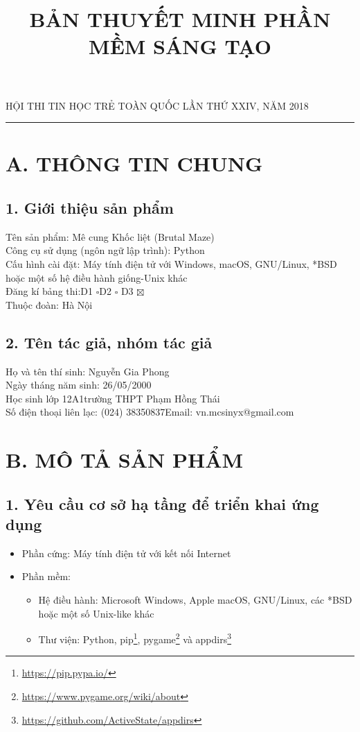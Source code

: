 \documentclass[a4paper,12pt]{article}
\title{BẢN THUYẾT MINH PHẦN MỀM SÁNG TẠO}
\author{}
\date{}
\begin{document}
\begin{center}
HỘI THI TIN HỌC TRẺ TOÀN QUỐC LẦN THỨ XXIV, NĂM 2018
\rule{0.7\textwidth}{0.4pt}
\end{center}
{\let\newpage\relax\maketitle}
\renewcommand*{\thefootnote}{\fnsymbol{footnote}}
\section*{A. THÔNG TIN CHUNG}
\subsection*{1. Giới thiệu sản phẩm}
Tên sản phẩm: Mê cung Khốc liệt (Brutal Maze)\\
Công cụ sử dụng (ngôn ngữ lập trình): Python\\
Cấu hình cài đặt: Máy tính điện tử với Windows, macOS, GNU/Linux, *BSD hoặc một
số hệ điều hành giống-Unix khác\\
Đăng kí bảng thi:\hspace{1cm}D1 $\square$\hspace{1in}D2 $\square$
\hspace{1in}D3 $\boxtimes$\\
Thuộc đoàn: Hà Nội

\subsection*{2. Tên tác giả, nhóm tác giả}
Họ và tên thí sinh: Nguyễn Gia Phong\\
Ngày tháng năm sinh: 26/05/2000\\
Học sinh lớp 12A1\hspace{1in}trường THPT Phạm Hồng Thái\\
Số điện thoại liên lạc: (024) 38350837\hspace{1in}Email: vn.mcsinyx@gmail.com

\section*{B. MÔ TẢ SẢN PHẨM}
\subsection*{1. Yêu cầu cơ sở hạ tầng để triển khai ứng dụng}
\begin{itemize}
  \item Phần cứng: Máy tính điện tử với kết nối Internet
  \item Phần mềm:
    \begin{itemize}
      \item Hệ điều hành: Microsoft Windows, Apple macOS, GNU/Linux, các *BSD
        hoặc một số Unix-like khác
      \item Thư viện: Python, pip\footnote{\url{https://pip.pypa.io/}},
        pygame\footnote{\url{https://www.pygame.org/wiki/about}} và
        appdirs\footnote{\url{https://github.com/ActiveState/appdirs}}
    \end{itemize}
\end{itemize}
\end{document}
